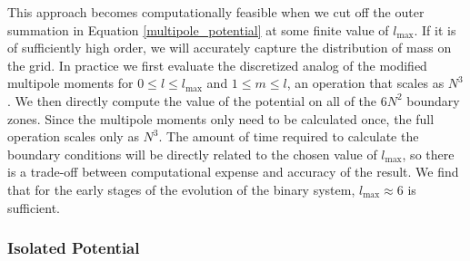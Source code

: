 \documentclass[12pt,preprint]{aastex}
\begin{document}

This approach becomes computationally feasible when we cut off the outer summation in Equation \ref{multipole_potential} at some finite value of $l_{\text{max}}$. If it is of sufficiently high order, we will accurately capture the distribution of mass on the grid. In practice we first evaluate the discretized analog of the modified multipole moments for $0 \leq l \leq l_{\text{max}}$ and $1 \leq m \leq l$, an operation that scales as $N^3$. We then directly compute the value of the potential on all of the $6N^2$ boundary zones. Since the multipole moments only need to be calculated once, the full operation scales only as $N^3$. The amount of time required to calculate the boundary conditions will be directly related to the chosen value of $l_{\text{max}}$, so there is a trade-off between computational expense and accuracy of the result. We find that for the early stages of the evolution of the binary system, $l_\text{max} \approx 6$ is sufficient.

\subsubsection{Isolated Potential}
\end{document}
